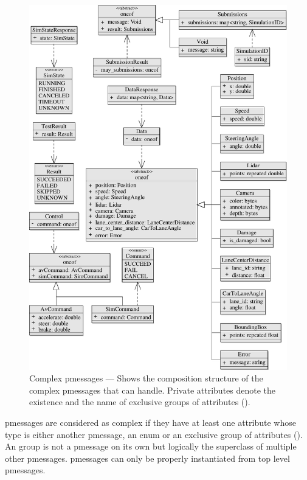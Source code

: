 \begin{figure}
    \centering
    \includegraphics[width=\textwidth, height=.95\textheight, keepaspectratio]{diagrams/messagesTypeGraph-2.pdf}
    \medskip
    \caption{%
        Complex \glspl{pmessage} --- Shows the composition structure of the complex \glspl{pmessage} that \drivebuild{} can handle.
        Private attributes denote the existence and the name of exclusive groups of attributes ().
    }\label{fig:complexMessages}
\end{figure}
\Glspl{pmessage} are considered as complex if they have at least one attribute whose type is either another \gls{pmessage}, an enum or an exclusive group of attributes ().
An  group is not a \gls{pmessage} on its own but logically the superclass of multiple other \glspl{pmessage}.
\Glspl{pmessage} can only be properly instantiated from top level \glspl{pmessage}.
